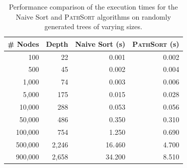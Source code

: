 \begin{table}[h]
    \centering
    \begin{tabular}{|r|r||r|r|}
        \hline
        \textbf{\# Nodes} & \textbf{Depth} & \textbf{Naive Sort (s)} & \textbf{\textsc{PathSort} (s)} \\
        \hline
            100 &    22 &  0.001 & 0.002 \\
            500 &    45 &  0.002 & 0.004 \\
          1,000 &    74 &  0.003 & 0.006 \\
          5,000 &   175 &  0.015 & 0.028 \\
         10,000 &   288 &  0.053 & 0.056 \\
         50,000 &   486 &  0.350 & 0.310 \\
        100,000 &   754 &  1.250 & 0.690 \\
        500,000 & 2,246 & 16.460 & 4.700 \\
        900,000 & 2,658 & 34.200 & 8.510 \\
        \hline
    \end{tabular}
    \caption{Performance comparison of the execution times for the Naive Sort and \textsc{PathSort} algorithms on randomly generated trees of varying sizes.}
    \label{tab:experiments}
\end{table}

